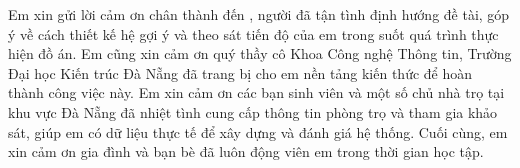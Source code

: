 \begin{acknowledgments}

Em xin gửi lời cảm ơn chân thành đến \dauGVHD, người đã tận tình định hướng
đề tài, góp ý về cách thiết kế hệ gợi ý và theo sát tiến độ của em trong
suốt quá trình thực hiện đồ án. Em cũng xin cảm ơn quý thầy cô Khoa Công
nghệ Thông tin, Trường Đại học Kiến trúc Đà Nẵng đã trang bị cho em nền
tảng kiến thức để hoàn thành công việc này. Em xin cảm ơn các bạn sinh viên
và một số chủ nhà trọ tại khu vực Đà Nẵng đã nhiệt tình cung cấp thông tin
phòng trọ và tham gia khảo sát, giúp em có dữ liệu thực tế để xây dựng và
đánh giá hệ thống. Cuối cùng, em xin cảm ơn gia đình và bạn bè đã luôn động
viên em trong thời gian học tập.

\vspace{1.4em}
\hfill{}

\end{acknowledgments}
